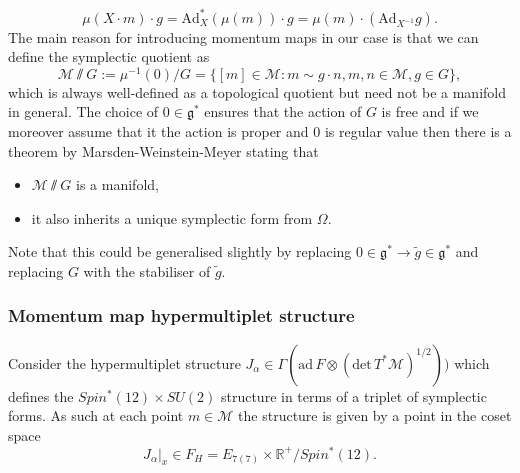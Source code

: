 \begin{equation}
    \mu(X\cdot m)\cdot g = \text{Ad}_{X}^*(\mu(m))\cdot g = \mu(m)\cdot(\text{Ad}_{X^{-1}}g). 
\end{equation}
The main reason for introducing momentum maps in our case is that we can define the symplectic quotient as 
\begin{equation}
    \mathcal{M}\sslash G := \mu^{-1}(0)/G = \{[m]\in \mathcal{M} : m\sim g\cdot n, m,n\in \mathcal{M}, g\in G\},
\end{equation}
which is always well-defined as a topological quotient but need not be a manifold in general. The choice of $0\in\mathfrak{g}^*$ ensures that the action of $G$ is free and if we moreover assume that it the action is proper and $0$ is regular value then there is a theorem by Marsden-Weinstein-Meyer stating that 
\begin{itemize}
    \item $\mathcal{M}\sslash G$ is a manifold,
    \item it also inherits a unique symplectic form from $\Omega$. 
\end{itemize}
Note that this could be generalised slightly by replacing $0\in\mathfrak{g}^*\to \tilde{g}\in\mathfrak{g}^*$ and replacing $G$ with the stabiliser of $\tilde{g}$.  

\subsubsection{Momentum map hypermultiplet structure}
Consider the hypermultiplet structure $J_\alpha\in\Gamma(\text{ad}\, F\otimes (\text{det}\, T^*\mathcal{M})^{1/2}))$ which defines the $Spin^*(12)\times SU(2)$ structure in terms of a triplet of symplectic forms. As such at each point $m\in\mathcal{M}$ the structure is given by a point in the coset space
\begin{equation}
    J_\alpha|_x \in F_H = E_{7(7)}\times\mathbb{R}^+/Spin^*(12).
\end{equation}

